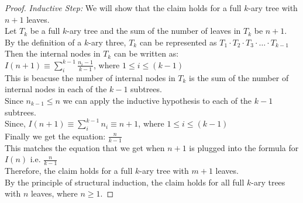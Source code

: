 \documentclass[a4paper, addpoints]{exam}
\theoremstyle{definition}
\theoremstyle{claim}
\begin{document}
\begin{questions}
\begin{solution}
\begin{proof}
      \textit{Inductive Step:} We will show that the claim holds for a full $k$-ary tree with $n+1$ leaves. \\
      Let $T_k$ be a full $k$-ary tree and the sum of the number of leaves in $T_k$ be $n+1$. \\
      By the definition of a $k$-ary three, $T_k$ can be represented as $T_1\cdot T_2\cdot T_3\cdot\ldots\cdot T_{k-1}$ \\
      Then the internal nodes in $T_k$ can be written as: \\
      $I(n+1) \equiv \sum_{i}^{k-1} \frac{n_i - 1}{k -1}$, where $1 \leq i \leq (k-1)$ \\
      This is beacuse the number of internal nodes in $T_k$ is the sum of the number of internal nodes in each of the $k-1$ subtrees. \\
      Since $n_{k-1} \leq n$ we can apply the inductive hypothesis to each of the $k-1$ subtrees. \\

      Since, $I(n+1) \equiv \sum_{i}^{k-1} n_i \equiv n+1$, where $1 \leq i \leq (k-1)$ \\
      Finally we get the equation: $\frac{n}{k -1}$ \\

      This matches the equation that we get when $n+1$ is plugged into the formula for $I(n)$ i.e. $\frac{n}{k -1}$ \\

      Therefore, the claim holds for a full $k$-ary tree with $m+1$ leaves. \\
      By the principle of structural induction, the claim holds for all full $k$-ary trees with $n$ leaves, where $n\geq 1$.
    \end{proof}
  \end{solution}
\end{questions}
\end{document}

